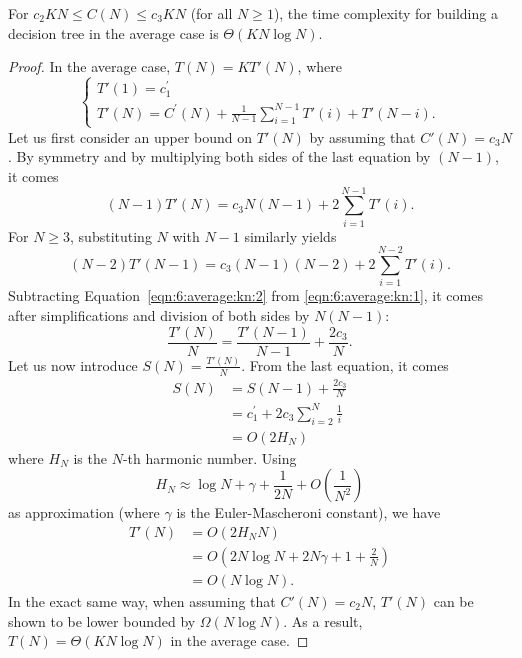 \begin{theorem}\label{thm:6:average:kn}
For $c_2 K N \leq C(N) \leq c_3 K N$ (for all $N \geq 1$), the time complexity for building a decision
tree in the average case is $\Theta(K N \log N)$.
\end{theorem}

\begin{proof}
In the average case, $T(N) = K T'(N)$, where
\begin{equation}
\begin{cases}
T'(1) = c_1^\prime \\
T'(N) = C^\prime(N) +  \frac{1}{N-1} \sum_{i=1}^{N-1} T'(i) + T'(N-i).
\end{cases}
\end{equation}
Let us first consider an upper bound on $T'(N)$ by assuming that $C'(N) = c_3 N$.
By symmetry and by multiplying both sides of the last equation by $(N-1)$, it comes
\begin{equation}\label{eqn:6:average:kn:1}
(N-1) T'(N) = c_3 N (N-1) +  2 \sum_{i=1}^{N-1} T'(i).
\end{equation}
For $N \geq 3$, substituting $N$ with $N-1$ similarly yields
\begin{equation}\label{eqn:6:average:kn:2}
(N-2) T'(N-1) = c_3 (N-1) (N-2) +  2 \sum_{i=1}^{N-2} T'(i).
\end{equation}
Subtracting Equation~\ref{eqn:6:average:kn:2} from \ref{eqn:6:average:kn:1},
it comes after simplifications and division of both sides by $N(N-1)$:
\begin{equation}
\frac{T'(N)}{N} = \frac{T'(N-1)}{N-1} + \frac{2 c_3}{N}.
\end{equation}
Let us now introduce $S(N) = \frac{T'(N)}{N}$. From the last equation, it comes
\begin{align}
S(N) &= S(N-1) + \frac{2 c_3}{N} \nonumber \\
     &= c_1^\prime +  2 c_3 \sum_{i=2}^N \frac{1}{i}  \nonumber \\
     &= O(2 H_N)
\end{align}
where $H_N$ is the $N$-th harmonic number. Using
\begin{equation}
H_N \approx \log N + \gamma + \frac{1}{2N} + O(\frac{1}{N^2})
\end{equation}
as approximation (where $\gamma$ is the Euler-Mascheroni constant), we have
\begin{align}
T'(N) &= O(2 H_N N) \nonumber \\
&= O(2 N \log N + 2 N\gamma + 1 + \frac{2}{N}) \nonumber \\
&= O(N \log N).
\end{align}
In the exact same way, when assuming that $C'(N) = c_2 N$, $T'(N)$ can be shown
to be lower bounded by $\Omega(N \log N)$. As a result, $T(N) = \Theta(KN \log N)$ in the average case.
\end{proof}

